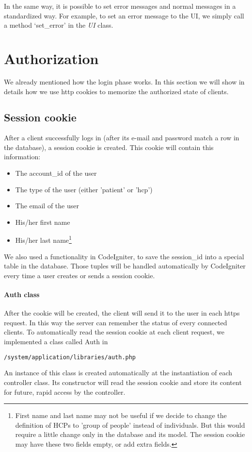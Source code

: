 In the same way, it is possible to set error messages and normal messages in a standardized way. For example, to set an error message to the UI, we simply call a method `set\_error' in the \emph{UI} class.


\section{Authorization}
We already mentioned how the login phase works. In this section we will show in details how we use http cookies to memorize the authorized state of clients.
\subsection{Session cookie}
After a client successfully logs in (after its e-mail and password match a row in the database), a session cookie is created. This cookie will contain this information:
\begin{itemize}
\item The account\_id of the user
\item The type of the user (either 'patient' or 'hcp')
\item The email of the user
\item His/her first name
\item His/her last name\footnote{First name and last name may not be useful if we decide to change the definition of HCPs to 'group of people' instead of individuals. But this would require a little change only in the database and its model. The session cookie may have these two fields empty, or add extra fields.}
\end{itemize}
We also used a functionality in CodeIgniter, to save the session\_id into a special table in the database. Those tuples will be handled automatically by CodeIgniter every time a user creates or sends a session cookie.

\paragraph{Auth class}
After the cookie will be created, the client will send it to the user in each https request. In this way the server can remember the status of every connected clients. To automatically read the session cookie at each client request, we implemented a class called Auth in
\begin{verbatim}
/system/application/libraries/auth.php
\end{verbatim}
An instance of this class is created automatically at the instantiation of each controller class. Its constructor will read the session cookie and store its content for future, rapid access by the controller.